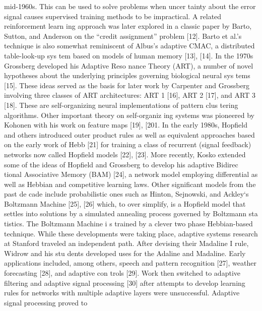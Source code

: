 \documentclass[11pt,a4paper,twocolumn]{article}
\begin{document}
mid-1960s. This can be used to solve problems when uncer
tainty about the error signal causes supervised training 
methods to be impractical. A related reinforcement learn
ing approach was later explored in a classic paper by Barto, 
Sutton, and Anderson on the “credit assignment” problem 
[12]. Barto et al.’s technique is also somewhat reminiscent 
of Albus’s adaptive CMAC, a distributed table-look-up sys
tem based on models of human memory [13], [14]. 
In the 1970s Grossberg developed his Adaptive Reso
nance Theory (ART), a number of novel hypotheses about 
the underlying principles governing biological neural sys
tems [15]. These ideas served as the basis for later work by 
Carpenter and Grossberg involving three classes of ART 
architectures: ART 1 [16], ART 2 [17], and ART 3 [18]. These 
are self-organizing neural implementations of pattern clus
tering algorithms. Other important theory on self-organiz
ing systems was pioneered by Kohonen with his work on 
feature maps [19], [201. 
In the early 1980s, Hopfield and others introduced outer 
product rules as well as equivalent approaches based on 
the early work of Hebb [21] for training a class of recurrent 
(signal feedback) networks now called Hopfield models [22], 
[23]. More recently, Kosko extended some of the ideas of 
Hopfield and Grossberg to develop his adaptive Bidirec
tional Associative Memory (BAM) [24], a network model 
employing differential as well as Hebbian and competitive 
learning laws. Other significant models from the past de
cade include probabilistic ones such as Hinton, Sejnowski, 
and Ackley‘s Boltzmann Machine [25], [26] which, to over
simplify, is a Hopfield model that settles into solutions by 
a simulated annealing process governed by Boltzmann sta
tistics. The Boltzmann Machine i s  trained by a clever two
phase Hebbian-based technique. 
While these developments were taking place, adaptive 
systems research at Stanford traveled an independent path. 
After devising their Madaline I rule, Widrow and his stu
dents developed uses for the Adaline and Madaline. Early 
applications included, among others, speech and pattern 
recognition [27], weather forecasting [28], and adaptive con
trols [29]. Work then switched to adaptive filtering and 
adaptive signal processing [30] after attempts to develop 
learning rules for networks with multiple adaptive layers 
were unsuccessful. Adaptive signal processing proved to 






\newpage
\end{document}
